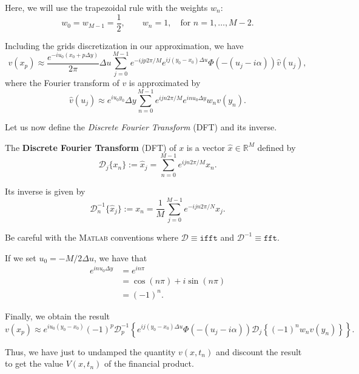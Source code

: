 Here, we will use the trapezoidal rule with the weights $w_n$:
$$w_0=w_{M-1} = \frac{1}{2},\qquad w_n = 1, \quad\text{for }n=1,\ldots,M-2.$$

Including the grids discretization in our approximation, we have
$$v(x_p) \approx\frac{e^{-iu_0(x_0+p\Delta y)}}{2\pi}\Delta u\sum_{j=0}^{M-1}e^{-ijp2\pi/M}e^{ij(y_0-x_0)\Delta u}\Phi(-(u_j-i\alpha))\hat{v}(u_j), $$
where the Fourier transform of $v$ is approximated by
$$\hat{v}(u_j) \approx e^{iu_0y_0}\Delta y \sum_{n=0}^{M-1}e^{ijn2\pi/M}e^{inu_0\Delta y}w_nv(y_n).$$

Let us now define the \textit{Discrete Fourier Transform} (DFT) and its inverse.
\begin{defn}
The \textbf{Discrete Fourier Transform} (DFT) of $x$ is a vector $\hat{x}\in\mathbb{R}^M$ defined by
$$\mathcal{D}_j\{x_n\} := \hat{x}_j = \sum_{n=0}^{M-1}e^{ijn2\pi/M}x_n.$$

Its inverse is given by
$$\mathcal{D}_n^{-1}\{\hat{x}_j\} := x_n =\frac{1}{M} \sum_{j=0}^{M-1}e^{-ijn2\pi/N}x_j.$$

Be careful with the \textsc{Matlab} conventions where $\mathcal{D} \equiv\texttt{ifft}$ and $\mathcal{D}^{-1}\equiv\texttt{fft}$.
\end{defn}

If we set $u_0 = -M/2\Delta u$, we have that
\begin{align*}
e^{inu_0\Delta y}&=e^{in\pi}\\
&=\cos(n\pi)+i\sin(n\pi)\\
&=(-1)^n.
\end{align*}

Finally, we obtain the result
$$v(x_p) \approx e^{iu_0(y_0-x_0)}(-1)^p\mathcal{D}_p^{-1}\left\{e^{ij(y_0-x_0)\Delta u}\Phi(-(u_j-i\alpha))\mathcal{D}_j\left\{(-1)^nw_nv(y_n)\right\}\right\}.$$

Thus, we have just to undamped the quantity $v(x,t_n)$ and discount the result to get the value $V(x,t_n)$ of the financial product.


